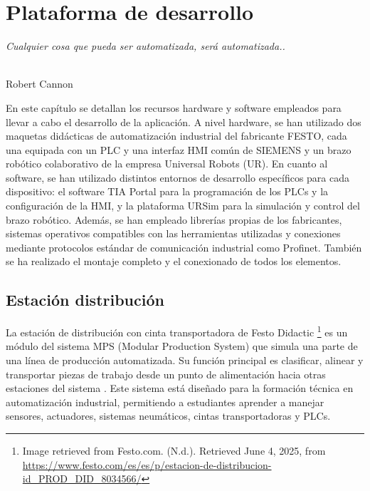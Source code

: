 \chapter{Plataforma de desarrollo}
\label{cap:capitulo3}

\begin{flushright}
\begin{minipage}[]{10cm}
\emph{Cualquier cosa que pueda ser automatizada, será automatizada..}\\
\end{minipage}\\

Robert Cannon\\
\end{flushright}

\vspace{1cm}

En este capítulo se detallan los recursos hardware y software empleados para llevar a cabo el desarrollo de la aplicación. A nivel hardware, se han utilizado dos maquetas didácticas de automatización industrial del fabricante FESTO, cada una equipada con un PLC y una interfaz HMI común de SIEMENS y un brazo robótico colaborativo de la empresa Universal Robots (UR). En cuanto al software, se han utilizado distintos entornos de desarrollo específicos para cada dispositivo: el software TIA Portal para la programación de los PLCs y la configuración de la HMI, y la plataforma URSim para la simulación y control del brazo robótico. Además, se han empleado librerías propias de los fabricantes, sistemas operativos compatibles con las herramientas utilizadas y conexiones mediante protocolos estándar de comunicación industrial como Profinet. También se ha realizado el montaje completo y el conexionado de todos los elementos.

\section{Estación distribución}

La estación de distribución con cinta transportadora de Festo Didactic \footnote{Image retrieved from Festo.com. (N.d.). Retrieved June 4, 2025, from \url{https://www.festo.com/es/es/p/estacion-de-distribucion-id_PROD_DID_8034566/}} es un módulo del sistema MPS (Modular Production System) que simula una parte de una línea de producción automatizada. Su función principal es clasificar, alinear y transportar piezas de trabajo desde un punto de alimentación hacia otras estaciones del sistema \cite{estacion_distribucion}. Este sistema está diseñado para la formación técnica en automatización industrial, permitiendo a estudiantes aprender a manejar sensores, actuadores, sistemas neumáticos, cintas transportadoras y PLCs. \\


